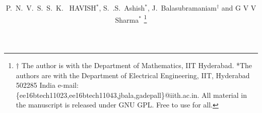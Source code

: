 \documentclass[journal,12pt,twocolumn]{IEEEtran}
\begin{document}
\let\StandardTheFigure\thefigure
\renewcommand{\thefigure}{\theproblem}



\def\putbox#1#2#3{\makebox[0in][l]{\makebox[#1][l]{}\raisebox{\baselineskip}[0in][0in]{\raisebox{#2}[0in][0in]{#3}}}}
     \def\rightbox#1{\makebox[0in][r]{#1}}
     \def\centbox#1{\makebox[0in]{#1}}
     \def\topbox#1{\raisebox{-\baselineskip}[0in][0in]{#1}}
     \def\midbox#1{\raisebox{-0.5\baselineskip}[0in][0in]{#1}}

\vspace{3cm}

\title{ 
}


%
%
%

\author{P.~N.~V.~S.~S.~K.~ HAVISH$^{*}$, S.~.S.~Ashish$^{*}$, J.~Balasubramaniam$^{\dagger}$ and G V V Sharma$^{*}$ %
\thanks{$\dagger$ The author is with the Department of Mathematics, IIT Hyderabad.  *The authors are with the Department
of Electrical Engineering, IIT, Hyderabad
502285 India e-mail: \{ee16btech11023,ee16btech11043,jbala,gadepall\}@iith.ac.in. All material in the manuscript is released under GNU GPL.  Free to use for all.}%
}
% 
%
\end{document}
